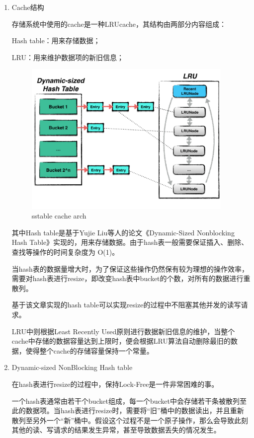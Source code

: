 		\begin{enumerate}
			\item Cache结构 
			
			存储系统中使用的cache是一种LRUcache，其结构由两部分内容组成：

			Hash table：用来存储数据；
			
			LRU：用来维护数据项的新旧信息；

			\begin{figure}[H]
				\centering
				\includegraphics[width=0.95\textwidth]{images/cache_arch.jpeg}
				\caption{sstable cache arch}
				\label{sstable_cache_arch}
			\end{figure}

			其中Hash table是基于Yujie Liu等人的论文《Dynamic-Sized Nonblocking Hash Table》实现的，用来存储数据。由于hash表一般需要保证插入、删除、查找等操作的时间复杂度为 O(1)。

当hash表的数据量增大时，为了保证这些操作仍然保有较为理想的操作效率，需要对hash表进行resize，即改变hash表中bucket的个数，对所有的数据进行重散列。

基于该文章实现的hash table可以实现resize的过程中不阻塞其他并发的读写请求。

LRU中则根据Least Recently Used原则进行数据新旧信息的维护，当整个cache中存储的数据容量达到上限时，便会根据LRU算法自动删除最旧的数据，使得整个cache的存储容量保持一个常量。


			\item Dynamic-sized NonBlocking Hash table
			
			在hash表进行resize的过程中，保持Lock-Free是一件非常困难的事。

一个hash表通常由若干个bucket组成，每一个bucket中会存储若干条被散列至此的数据项。当hash表进行resize时，需要将“旧”桶中的数据读出，并且重新散列至另外一个“新”桶中。假设这个过程不是一个原子操作，那么会导致此刻其他的读、写请求的结果发生异常，甚至导致数据丢失的情况发生。


\end{enumerate}
